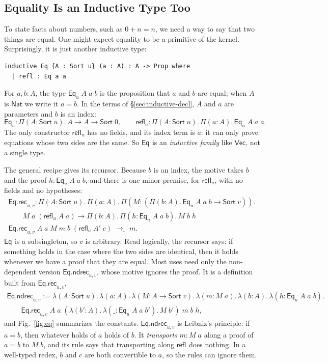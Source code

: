 \documentclass[acmsmall,screen,nonacm]{acmart}
\newcommand{\Sort}[1]{\mathsf{Sort}\;#1}
\newcommand{\tPi}[3]{\Pi(#1{:}#2).\,#3}
\newcommand{\tLam}[3]{\lambda(#1{:}#2).\,#3}
\newcommand{\Nat}{\mathsf{Nat}}
\newcommand{\Eq}[1]{\mathsf{Eq}_{#1}}
\newcommand{\refl}[1]{\mathsf{refl}_{#1}}
\newcommand{\EqRec}[1]{\mathsf{Eq.ndrec}_{#1}}
\newcommand{\EqRecDep}[1]{\mathsf{Eq.rec}_{#1}}
\newcommand{\iotared}{\to_{\iota}}
\begin{document}
\subsection{Equality Is an Inductive Type Too}
\label{sec:eq}

To state facts about numbers, such as $0 + n = n$, we need a way to say that two things are equal.
One might expect equality to be a primitive of the kernel.
Surprisingly, it is just another inductive type:
\begin{lstlisting}[numbers=none, columns=fullflexible, keepspaces=true]
inductive Eq {A : Sort u} (a : A) : A -> Prop where
  | refl : Eq a a
\end{lstlisting}
For $a, b : A$, the type $\Eq{u}\;A\;a\;b$ is the proposition that $a$ and $b$ are equal; when $A$ is $\Nat$ we write it $a = b$.
In the terms of \S\ref{sec:inductive-decl}, $A$ and $a$ are parameters and $b$ is an index:
\[
\Eq{u} : \tPi{A}{\Sort{u}}{A \to A \to \Sort{0}}, \qquad
\refl{u} : \tPi{A}{\Sort{u}}{\tPi{a}{A}{\Eq{u}\;A\;a\;a}}.
\]
The only constructor $\refl{u}$ has no fields, and its index term is $a$: it can only prove equations whose two sides are the same.
So $\Eq{}$ is an \emph{inductive family} like $\mathsf{Vec}$, not a single type.

The general recipe gives its recursor.
Because $b$ is an index, the motive takes $b$ and the proof $h : \Eq{u}\;A\;a\;b$, and there is one minor premise, for $\refl{u}$, with no fields and no hypotheses:
\[
\begin{array}{l}
\EqRecDep{u,v} : \tPi{A}{\Sort{u}}{\tPi{a}{A}{\tPi{M}{(\tPi{b}{A}{\Eq{u}\;A\;a\;b \to \Sort{v}})}{{}}}} \\
\qquad M\;a\;(\refl{u}\;A\;a) \to \tPi{b}{A}{\tPi{h}{\Eq{u}\;A\;a\;b}{M\;b\;h}} \\[6pt]
\EqRecDep{u,v}\;A\;a\;M\;m\;b\;(\refl{u}\;A'\;c) \;\iotared\; m.
\end{array}
\]
$\Eq{}$ is a subsingleton, so $v$ is arbitrary.
Read logically, the recursor says: if something holds in the case where the two sides are identical, then it holds whenever we have a proof that they are equal.
Most uses need only the non-dependent version $\EqRec{u,v}$, whose motive ignores the proof.
It is a definition built from $\EqRecDep{u,v}$,
\[
\begin{array}{l}
\EqRec{u,v} \mathrel{:=} \tLam{A}{\Sort{u}}{\tLam{a}{A}{\tLam{M}{A \to \Sort{v}}{\tLam{m}{M\;a}{\tLam{b}{A}{\tLam{h}{\Eq{u}\;A\;a\;b}{{}}}}}}} \\
\qquad \EqRecDep{u,v}\;A\;a\;(\tLam{b'}{A}{\tLam{\_}{\Eq{u}\;A\;a\;b'}{M\;b'}})\;m\;b\;h,
\end{array}
\]
and Fig.~\ref{fig:eq} summarizes the constants.
$\EqRec{u,v}$ is Leibniz's principle: if $a = b$, then whatever holds of $a$ holds of $b$.
It \emph{transports} $m : M\;a$ along a proof of $a = b$ to $M\;b$, and its rule says that transporting along $\refl{}$ does nothing.
In a well-typed redex, $b$ and $c$ are both convertible to $a$, so the rules can ignore them.
\end{document}
